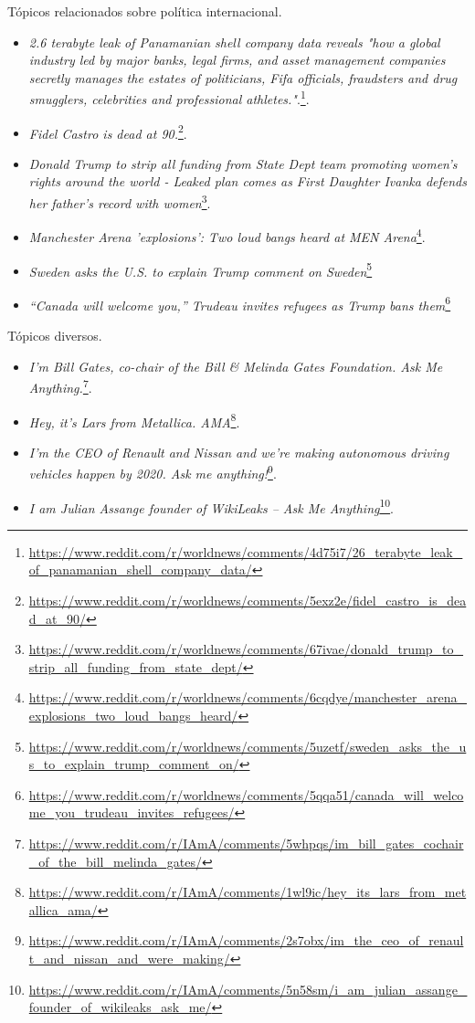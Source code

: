Tópicos relacionados sobre política internacional.
\begin{itemize}
  \item
  \textit{2.6 terabyte leak of Panamanian shell company data reveals "how a
  global industry led by major banks, legal firms, and asset management companies
  secretly manages the estates of politicians, Fifa officials, fraudsters and
  drug smugglers, celebrities and professional
  athletes."}.\footnote{\url{https://www.reddit.com/r/worldnews/comments/4d75i7/26_terabyte_leak_of_panamanian_shell_company_data/}}.
  \item
  \textit{Fidel Castro is dead at
  90.}\footnote{\url{https://www.reddit.com/r/worldnews/comments/5exz2e/fidel_castro_is_dead_at_90/}}.
  
  \item
  \textit{Donald Trump to strip all funding from State Dept team promoting women's rights around the world - Leaked plan comes as First Daughter Ivanka defends her father's record with women}\footnote{\url{https://www.reddit.com/r/worldnews/comments/67ivae/donald_trump_to_strip_all_funding_from_state_dept/}}.
  
  \item
  \textit{Manchester Arena 'explosions': Two loud bangs heard at MEN Arena}\footnote{\url{https://www.reddit.com/r/worldnews/comments/6cqdye/manchester_arena_explosions_two_loud_bangs_heard/}}.
  
  \item
  \textit{Sweden asks the U.S. to explain Trump comment on
  Sweden}\footnote{\url{https://www.reddit.com/r/worldnews/comments/5uzetf/sweden_asks_the_us_to_explain_trump_comment_on/}}
  
  \item\textit{“Canada will welcome you,” Trudeau invites refugees as Trump bans
  them}\footnote{\url{https://www.reddit.com/r/worldnews/comments/5qqa51/canada_will_welcome_you_trudeau_invites_refugees/}}
\end{itemize}

Tópicos diversos.
\begin{itemize}
  \item
  \textit{I’m Bill Gates, co-chair of the Bill \& Melinda Gates Foundation. Ask
  Me Anything.}\footnote{\url{https://www.reddit.com/r/IAmA/comments/5whpqs/im_bill_gates_cochair_of_the_bill_melinda_gates/}}.
  \item
  \textit{Hey, it's Lars from Metallica. AMA}\footnote{\url{https://www.reddit.com/r/IAmA/comments/1wl9ic/hey_its_lars_from_metallica_ama/}}.
  
  \item
  \textit{I'm the CEO of Renault and Nissan and we're making autonomous driving vehicles happen by 2020. Ask me anything!}\footnote{\url{https://www.reddit.com/r/IAmA/comments/2s7obx/im_the_ceo_of_renault_and_nissan_and_were_making/}}.
  
  \item
  \textit{I am Julian Assange founder of WikiLeaks -- Ask Me Anything}\footnote{\url{https://www.reddit.com/r/IAmA/comments/5n58sm/i_am_julian_assange_founder_of_wikileaks_ask_me/}}.
  
\end{itemize}


